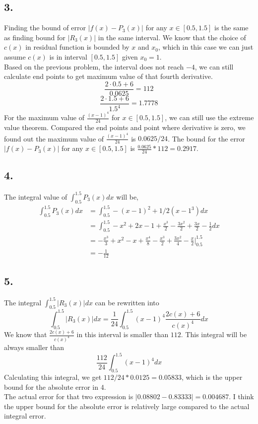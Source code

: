 \documentclass{article}
\begin{document}
\subsection*{3.}
Finding the bound of error $|f(x) - P_3(x)|$ for any $x \in [0.5,1.5]$ is the same as finding bound for $|R_3(x)|$ in the same interval.
We know that the choice of $c(x)$ in residual function is bounded by $x$ and $x_0$, which in this case we can just assume $c(x)$ is in interval $[0.5,1.5]$ given $x_0=1$.
\\
Based on the previous problem, the interval does not reach $-4$, we can still calculate end points to get maximum value of that fourth derivative.
$$\frac{2\cdot 0.5 + 6}{0.0625} = 112$$
$$\frac{2\cdot 1.5 + 6}{1.5^4} = 1.7778$$
For the maximum value of $\frac{(x-1)^4}{24}$ for $x \in [0.5,1.5]$, we can still use the extreme value theorem.
Compared the end points and point where derivative is zero, we found out the maximum value of $\frac{(x-1)^4}{24}$ is $0.0625/24$.
The bound for the error $|f(x) - P_3(x)|$ for any $x \in [0.5, 1.5]$ is $\frac{0.0625}{24} * 112 = 0.2917$.
\subsection*{4.}
The integral value of $\int_{0.5}^{1.5}P_3(x)dx$ will be,
\begin{align}
    \int_{0.5}^{1.5}P_3(x)dx &= \int_{0.5}^{1.5}-(x-1)^2 + 1/2(x-1^3)dx \nonumber \\
    &= \int_{0.5}^{1.5} -x^2 + 2x - 1 + \frac{x^3}{2} - \frac{3x^2}{2} + \frac{3x}{2} - \frac{1}{2}dx \nonumber \\
    &= -\frac{x^3}{3} + x^2 -x + \frac{x^4}{8} - \frac{x^3}{2} + \frac{3x^2}{4} - \frac{x}{2}\Bigg|_{0.5}^{1.5} \nonumber\\
    &= - \frac{1}{12} \nonumber
\end{align}



\subsection*{5.}
The integral $\int_{0.5}^{1.5}|R_3(x)|dx$ can be rewritten into
$$\int_{0.5}^{1.5}|R_3(x)|dx = \frac{1}{24}\int_{0.5}^{1.5}(x-1)^4 \frac{2c(x)+6}{c(x)^4}dx$$
We know that $\frac{2c(x)+6}{c(x)^4}$ in this interval is smaller than $112$.
This integral will be always smaller than
$$\frac{112}{24}\int_{0.5}^{1.5}(x-1)^4dx$$
Calculating this integral, we get $112/24 * 0.0125 = 0.05833$, which is the upper bound for the absolute error in 4.
\\
The actual error for that two expression is $|0.08802 - 0.83333| = 0.004687$. I think the upper bound for the absolute error is relatively large compared to the actual integral error.
\end{document}
